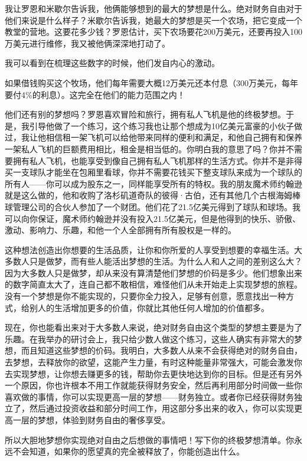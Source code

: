我让罗恩和米歇尔告诉我，他俩能够想到的最大的梦想是什么。绝对财务自由对于他们来说是什么样子？米歇尔告诉我，她最大的梦想是买一个农场，把它变成一个教堂的营地。这要花多少钱？罗恩估计，买下农场要花200万美元，还要再投入100万美元进行维修，我又被他俩深深地打动了。

我可以看到在梳理这些数字的时候，他们发自内心的激动。

如果借钱购买这个牧场，他们每年需要大概12万美元还本付息（300万美元，每年要付4\%的利息）。这完全在他们的能力范围之内！

他们还有别的梦想吗？罗恩喜欢冒险和旅行，拥有私人飞机是他的终极梦想。于是，我引导他做了一个练习，这个练习我也让那个想成为10亿美元富豪的小伙子做过，我让他相信租一架飞机可以给他带来同样的便利和满足，和他自己拥有和保养一架私人飞机的巨额费用相比，租金是相当低的。你明白我的意思了吗？你并不需要拥有私人飞机，也能享受到像自己拥有私人飞机那样的生活方式。你并不是非得买一支球队才能坐在包厢里看球，你并不需要花钱买下整支球队来成为一个球队的所有人——你可以成为股东之一，同样能享受所有的特权。我的朋友魔术师约翰逊就是这么做的，他和收购了洛杉矶道奇队的彼得·古伯，还有其他几个古根海姆棒球管理公司的合伙人参加了一个财团。他们花了21.5亿美元得到了球队和球场。我可以向你保证，魔术师约翰逊并没有投入21.5亿美元，但是他得到的快乐、骄傲、激动、影响力、乐趣，和他一个人全部拥有所有股权是一样的。

这种想法创造出你想要的生活品质，让你和你所爱的人享受到想要的幸福生活。大多数人只是做梦，而有些人能活出梦想的生活。为什么人和人之间的差别这么大？因为大多数人只是做梦，却从来没有算清楚他们梦想的价码是多少。他们想象出来的数字简直太大了，连自己都不敢相信，难怪他们从未开始走上实现梦想的旅程。没有一个梦想是你不能实现的，只要你全力投入，足够有创意，愿意找出一种方式，给别人的生活增加更多的价值，你就比其他任何人增加的价值都多。

现在，你也能看出来对于大多数人来说，绝对财务自由这个类型的梦想主要是为了乐趣。在我举办的研讨会上，我只给少数人做这个练习，这些人确实有非常大的梦想，而且知道这些梦想的价码。我明白，大多数人从来不会获得绝对的财务自由，去梦想，去释放你的欲望，这能产生力量，有时这种能量非常强大，可能会激发你去实现梦想，让你想去赚更多的钱，帮助你去更快地达到你的目标。但是还有另外一个原因，你也许根本不用工作就能获得财务安全，然后再利用部分时间做一些你喜欢做的事情，你可以实现更高一层的梦想——财务独立。或者你已经获得财务独立了，然后通过投资收益和部分时间工作，用这部分多出来的收入，你可以实现更高一层的梦想，体验到财务自由的奢侈享受。

所以大胆地梦想你实现绝对自由之后想做的事情吧！写下你的终极梦想清单。你永远不会知道，如果你的愿望真的完全被释放了，你能创造出什么。

